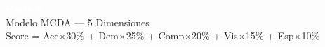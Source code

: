\documentclass[aspectratio=169, 11pt]{beamer}
\begin{document}

{
\begin{frame}[plain]
\vfill
\begin{center}
{\Huge\bfseries\textcolor{white}{Parte 6}}\\[8pt]
{\Large\textcolor{white!85}{Modelo MCDA --- 5 Dimensiones}}\\[12pt]
{\normalsize\textcolor{white!60}{Score = Acc$\times$30\% + Dem$\times$25\% + Comp$\times$20\% + Vis$\times$15\% + Esp$\times$10\%}}
\end{center}
\vfill
\end{frame}
}
\end{document}
